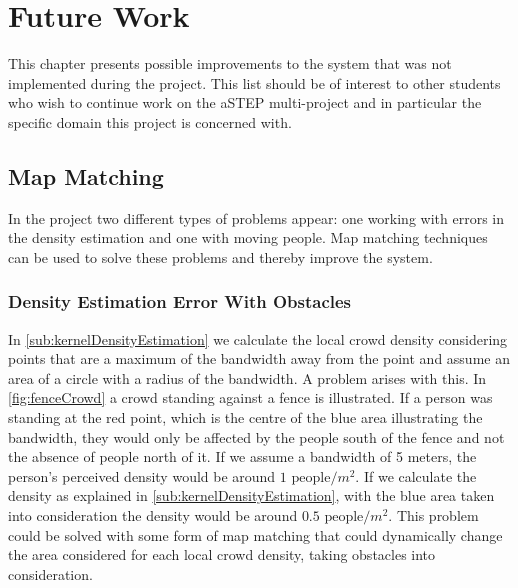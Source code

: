\chapter{Future Work}\label{ch:future_work}

This chapter presents possible improvements to the system that was not implemented during the project. This list should be of interest to other students who wish to continue work on the aSTEP multi-project and in particular the specific domain this project is concerned with.

\section{Map Matching}
In the project two different types of problems appear: one working with errors in the density estimation and one with moving people. Map matching techniques can be used to solve these problems and thereby improve the system.

\subsection{Density Estimation Error With Obstacles}
In \cref{sub:kernelDensityEstimation} we calculate the local crowd density considering points that are a maximum of the bandwidth away from the point and assume an area of a circle with a radius of the bandwidth. A problem arises with this. In \cref{fig:fenceCrowd} a crowd standing against a fence is illustrated. If a person was standing at the red point, which is the centre of the blue area illustrating the bandwidth, they would only be affected by the people south of the fence and not the absence of people north of it. If we assume a bandwidth of 5 meters, the person's perceived density would be around $1 \text{ people} / m^2$. If we calculate the density as explained in \cref{sub:kernelDensityEstimation}, with the blue area taken into consideration the density would be around $0.5 \text{ people} / m^2$.
This problem could be solved with some form of map matching that could dynamically change the area considered for each local crowd density, taking obstacles into consideration.

